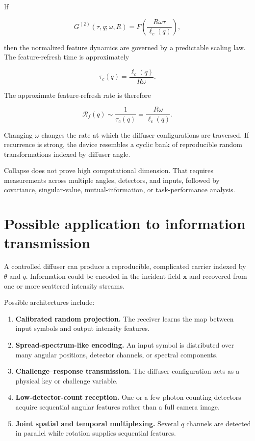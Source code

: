 \documentclass[11pt,letterpaper]{article}
\newcommand{\Gnorm}{G^{(2)}}
\begin{document}
If

\begin{equation}
    \Gnorm(\tau,q;\omega,R)
    =
    F\left(
    \frac{R\omega\tau}{\ell_c(q)}
    \right),
\end{equation}

then the normalized feature dynamics are governed by a predictable scaling
law. The feature-refresh time is approximately

\begin{equation}
    \tau_c(q)
    =
    \frac{\ell_c(q)}{R\omega}.
\end{equation}

The approximate feature-refresh rate is therefore

\begin{equation}
    \mathcal{R}_f(q)
    \sim
    \frac{1}{\tau_c(q)}
    =
    \frac{R\omega}{\ell_c(q)}.
\end{equation}

Changing $\omega$ changes the rate at which the diffuser configurations are
traversed. If recurrence is strong, the device resembles a cyclic bank of
reproducible random transformations indexed by diffuser angle.

Collapse does not prove high computational dimension. That requires
measurements across multiple angles, detectors, and inputs, followed by
covariance, singular-value, mutual-information, or task-performance
analysis.

\section{Possible application to information transmission}

A controlled diffuser can produce a reproducible, complicated carrier
indexed by $\theta$ and $q$. Information could be encoded in the incident
field $\bm{x}$ and recovered from one or more scattered intensity streams.

Possible architectures include:

\begin{enumerate}[leftmargin=2em]
    \item \textbf{Calibrated random projection.}
    The receiver learns the map between input symbols and output intensity
    features.

    \item \textbf{Spread-spectrum-like encoding.}
    An input symbol is distributed over many angular positions, detector
    channels, or spectral components.

    \item \textbf{Challenge--response transmission.}
    The diffuser configuration acts as a physical key or challenge variable.

    \item \textbf{Low-detector-count reception.}
    One or a few photon-counting detectors acquire sequential angular
    features rather than a full camera image.

    \item \textbf{Joint spatial and temporal multiplexing.}
    Several $q$ channels are detected in parallel while rotation supplies
    sequential features.
\end{enumerate}
\end{document}
